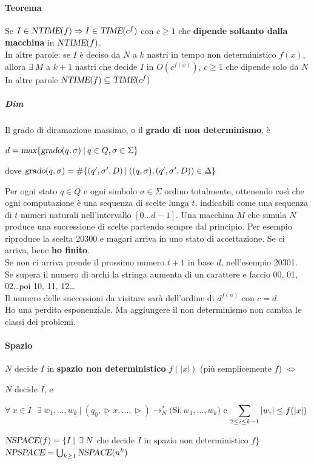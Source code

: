 \documentclass[10pt]{book}
\begin{document}
\paragraph{Teorema} Se $I \in \textsl{NTIME}(f) \Rightarrow I \in \textsl{TIME}(c^f)   $ con $c \geq 1$ che \textbf{dipende soltanto dalla macchina} in $\textsl{NTIME}(f)$.\\ In altre parole: se $I$ è deciso da $N$ a $k$ nastri in tempo non deterministico $f(x)$, allora $\exists\:M$ a $k+1$ nastri che decide $I$ in $O(c^{f(x)})$, $c \geq 1$ che dipende solo da $N$\\
In altre parole $\textsl{NTIME}(f) \subseteq \textsl{TIME}(c^f)$
\subparagraph{Dim} Il grado di diramazione massimo, o il \textbf{grado di non determinismo}, è 
\begin{list}{}{}
	\item $d = \textsl{max}\{\textsl{grado}(q, \sigma)\:|\:q\in Q, \sigma \in \Sigma\}$
	\item dove $\textsl{grado}(q, \sigma) = \#\{(q', \sigma', D)\:|\:((q, \sigma), (q', \sigma', D))\in \Delta \}$
\end{list}
Per ogni stato $q \in Q$ e ogni simbolo $\sigma \in \Sigma$ ordino totalmente, ottenendo così che ogni computazione è una sequenza di scelte lunga $t$, indicabili come una sequenza di $t$ numeri naturali nell'intervallo $[0\ldots d-1]$. Una macchina $M$ che simula $N$ produce una successione di scelte partendo sempre dal principio. Per esempio riproduce la scelta 20300 e magari arriva in uno stato di accettazione. Se ci arriva, bene \textbf{ho finito}.\\
Se non ci arriva prende il prossimo numero $t+1$ in base $d$, nell'esempio 20301.\\
Se supera il numero di archi la stringa aumenta di un carattere e faccio 00, 01, 02\ldots poi 10, 11, 12\ldots\\
Il numero delle successioni da visitare sarà dell'ordine di $d^{f(n)}$ con $c = d$.\\
Ho una perdita esponenziale. Ma aggiungere il non determinismo non cambia le classi dei problemi.
\paragraph{Spazio} $N$ decide $I$ in \textbf{spazio non deterministico} $f(|x|)$ (più semplicemente $f$) $\Leftrightarrow$
\begin{list}{}{}
	\item $N$ decide $I$, e
	\item $\forall\: x \in I\:\:\:\exists\:w_1,\ldots, w_k\:|\:(q_0, \underline{\triangleright}x,\ldots,\underline{\triangleright})\rightarrow_N^*($Si$, w_1, \ldots, w_k)$ e $\mathlarger{\sum_{2\leq i \leq k-1}|w_i| \leq f(|x|)}$
\end{list}
$\textsl{NSPACE}(f) = \{I\:|\:\:\exists\:N$ che decide $I$ in spazio non deterministico $f$\}\\
$\textsl{NPSPACE} = \bigcup_{k\geq 1}\textsl{NSPACE}(n^k)$
\end{document}

